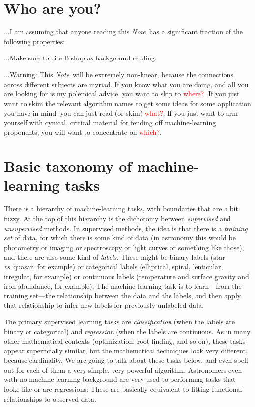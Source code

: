 \documentclass[12pt, twoside, letterpaper]{article}
\newcommand{\documentname}{\textsl{Note}}
\newcommand{\foreign}[1]{\textsl{#1}}
\newcommand{\vs}{\foreign{vs}}
\newcommand{\todo}[1]{\textcolor{red}{#1}}  %
\begin{document}
\section{Who are you?}

...I am assuming that anyone reading this \documentname\ has a
significant fraction of the following properties:

...Make sure to cite Bishop as background reading.

...Warning: This \documentname\ will be extremely non-linear, because
the connections across different subjects are myriad. If you know what
you are doing, and all you are looking for is my polemical advice, you
want to skip to \todo{where?}. If you just want to skim the relevant
algorithm names to get some ideas for some application you have in
mind, you can just read (or skim) \todo{what?}. If you just want to arm
yourself with cynical, critical material for fending off machine-learning
proponents, you will want to concentrate on \todo{which?}.

\section{Basic taxonomy of machine-learning tasks}

There is a hierarchy of machine-learning tasks, with boundaries that
are a bit fuzzy.
At the top of this hierarchy is the dichotomy between \emph{supervised}
and \emph{unsupervised} methods.
In supervised methods, the idea is that there is a \emph{training set}
of data, for which there is some kind of data (in astronomy this would
be photometry or imaging or spectroscopy or light curves or something like those),
and there are also some kind of \emph{labels}.
These might be binary labels (star \vs\ quasar, for example) or
categorical labels (elliptical, spiral, lenticular, irregular, for
example) or continuous labels (temperature and surface gravity and
iron abundance, for example).
The machine-learning task is to learn---from the training set---the
relationship between the data and the labels, and then apply that
relationship to infer new labels for previously unlabeled data.

The primary supervised learning tasks are \emph{classification} (when
the labels are binary or categorical) and \emph{regression} (when the
labels are continuous.
As in many other mathematical contexts (optimization, root finding,
and so on), these tasks appear superficially similar, but the mathematical
techniques look very different, because cardinality.
We are going to talk about these tasks below, and even spell out for
each of them a very simple, very powerful algorithm.
Astronomers even with no machine-learning background are very used
to performing tasks that looke like or are regressions:
These are basically equivalent to fitting functional relationships to
observed data.
\end{document}
